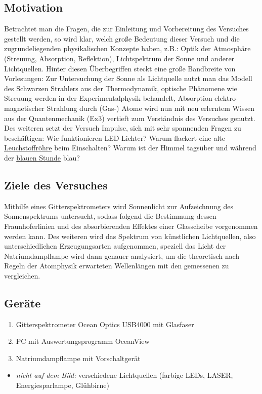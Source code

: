 \subsection{Motivation}
Betrachtet man die Fragen, die zur Einleitung und Vorbereitung des Versuches gestellt werden, so wird klar, welch große Bedeutung dieser Versuch und die zugrundeliegenden physikalischen Konzepte haben, z.B.: Optik der Atmosphäre (Streuung, Absorption, Reflektion), Lichtspektrum der Sonne und anderer Lichtquellen. Hinter diesen Überbegriffen steckt eine große Bandbreite von Vorlesungen: Zur Untersuchung der Sonne als Lichtquelle nutzt man das Modell des Schwarzen Strahlers aus der Thermodynamik, optische Phänomene wie Streuung werden in der Experimentalphysik behandelt, Absorption elektro-magnetischer Strahlung durch (Gas-) Atome wird nun mit neu erlerntem Wissen aus der Quantenmechanik (Ex3) vertieft zum Verständnis des Versuches genutzt. Des weiteren setzt der Versuch Impulse, sich mit sehr spannenden Fragen zu beschäftigen: Wie funktionieren LED-Lichter? Warum flackert eine alte \href{https://de.wikipedia.org/wiki/Leuchtstofflampe}{Leuchstoffröhre} beim Einschalten? Warum ist der Himmel tagsüber und während der \href{https://de.wikipedia.org/wiki/Blaue_Stunde}{blauen Stunde} blau?
\vspace{1cm}
\newpage

\subsection{Ziele des Versuches}
Mithilfe eines Gitterspektrometers wird Sonnenlicht zur Aufzeichnung des Sonnenspektrums untersucht, sodass folgend die Bestimmung dessen Fraunhoferlinien und des absorbierenden Effektes einer Glasscheibe vorgenommen werden kann. Des weiteren wird das Spektrum von künstlichen Lichtquellen, also unterschiedlichen Erzeugungsarten aufgenommen, speziell das Licht der Natriumdampflampe wird dann genauer analysiert, um die theoretisch nach Regeln der Atomphysik erwarteten Wellenlängen mit den gemessenen zu vergleichen. 

\subsection{Geräte}
\begin{enumerate}
    \item Gitterspektrometer Ocean Optics USB4000 mit Glasfaser
    \item PC mit Auswertungsprogramm OceanView
    \item Natriumdampflampe mit Vorschaltgerät
\end{enumerate}
\begin{itemize}
    \item \textit{nicht auf dem Bild:} verschiedene Lichtquellen (farbige LEDs, LASER, Energiesparlampe, Glühbirne)
\end{itemize}

